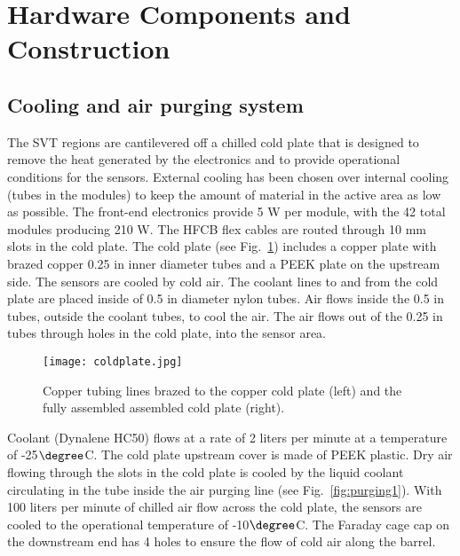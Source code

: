 \section{Hardware Components and Construction}

\subsection{Cooling and air purging system}

The SVT regions are cantilevered off a chilled cold plate that is designed to remove the heat generated by the electronics and to provide operational  conditions for the sensors. External cooling has been chosen over internal cooling (tubes in the modules) to keep the amount of material in the active area as low as possible. The front-end electronics provide 5 W per module, with the 42 total modules producing 210 W. The HFCB flex cables are routed through 10 mm slots in the cold plate. The cold plate (see Fig.~\ref{fig:coldplate}) includes a copper plate with brazed  copper 0.25 in inner diameter tubes and a PEEK plate on the upstream side. The sensors are cooled by cold air.  The coolant lines to and from the cold plate are placed inside of 0.5 in diameter nylon tubes.  Air flows inside the 0.5 in tubes, outside the coolant tubes, to cool the air.  The air flows out of the 0.25 in tubes through holes in the cold plate, into the sensor area.

\begin{figure}[hbt] 
\centering 
\texttt{[image: coldplate.jpg]}
\caption{Copper tubing lines brazed to the copper cold plate (left) and the fully assembled assembled cold plate (right).}
\label{fig:coldplate}
\end{figure}


Coolant (Dynalene HC50) flows at a rate of 2 liters per minute at a temperature of -25$\degree$C. The cold plate upstream cover is made of PEEK plastic. Dry air flowing through the slots in the cold plate is cooled by the liquid coolant circulating in the tube inside the air purging line (see Fig.~\ref{fig:purging1}). With 100 liters per minute of chilled air flow across the cold plate, the sensors are cooled to the operational temperature of -10$\degree$C. The Faraday cage cap on the downstream end has 4 holes to ensure the flow of cold air along the barrel. 

